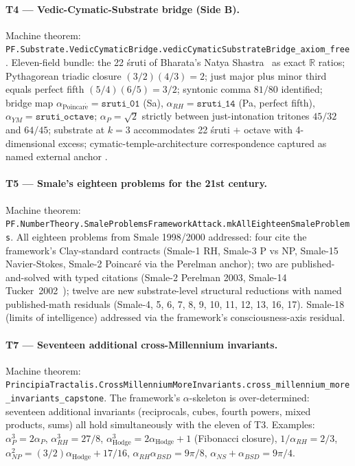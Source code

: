 \documentclass[11pt,a4paper]{article}
\theoremstyle{definition}
\begin{document}
\paragraph{T4 — Vedic-Cymatic-Substrate bridge (Side B).} Machine
theorem:
\texttt{PF.Substrate.VedicCymaticBridge.vedicCymaticSubstrateBridge\_axiom\_free}.
Eleven-field bundle: the 22 \'sruti of Bharata's Natya
Shastra~\cite{bharatamuninatyashastra} as exact $\mathbb{R}$ ratios;
Pythagorean triadic closure $(3/2)(4/3) = 2$; just major plus minor
third equals perfect fifth $(5/4)(6/5) = 3/2$; syntonic comma
$81/80$ identified; bridge map
$\alpha_{\mathrm{Poincar\acute{e}}} = \texttt{sruti\_01}$ (Sa),
$\alpha_{RH} = \texttt{sruti\_14}$ (Pa, perfect fifth),
$\alpha_{YM} = \texttt{sruti\_octave}$; $\alpha_P = \sqrt{2}$
strictly between just-intonation tritones $45/32$ and $64/45$;
substrate at $k = 3$ accommodates 22 \'sruti $+$ octave with
4-dimensional excess; cymatic-temple-architecture correspondence
captured as named external anchor \cite{chladni1787,jenny1967cymatics}.

\paragraph{T5 — Smale's eighteen problems for the 21st century.}
Machine theorem:
\texttt{PF.NumberTheory.SmaleProblemsFrameworkAttack.\allowbreak{}mkAllEighteenSmaleProblems}.
All eighteen problems from Smale 1998/2000
\cite{smale1998mathintelligencer,smale2000frontiers} addressed:
four cite the framework's Clay-standard contracts (Smale-1 RH,
Smale-3 P vs NP, Smale-15 Navier-Stokes, Smale-2 Poincar\'e via
the Perelman anchor); two are published-and-solved with typed
citations (Smale-2 Perelman 2003, Smale-14 Tucker~2002~\cite{tucker2002lorenz});
twelve are new substrate-level structural reductions with named
published-math residuals (Smale-4, 5, 6, 7, 8, 9, 10, 11, 12, 13,
16, 17). Smale-18 (limits of intelligence) addressed via the
framework's consciousness-axis residual.

\paragraph{T7 — Seventeen additional cross-Millennium invariants.}
Machine theorem:
\texttt{PrincipiaTractalis.CrossMillenniumMoreInvariants.\allowbreak{}cross\_millennium\_more\_invariants\_capstone}.
The framework's $\alpha$-skeleton is over-determined: seventeen
additional invariants (reciprocals, cubes, fourth powers, mixed
products, sums) all hold simultaneously with the eleven of T3.
Examples: $\alpha_P^3 = 2 \alpha_P$, $\alpha_{RH}^3 = 27/8$,
$\alpha_{\mathrm{Hodge}}^3 = 2 \alpha_{\mathrm{Hodge}} + 1$
(Fibonacci closure), $1/\alpha_{RH} = 2/3$,
$\alpha_{NP}^2 = (3/2) \alpha_{\mathrm{Hodge}} + 17/16$,
$\alpha_{RH} \alpha_{BSD} = 9\pi/8$,
$\alpha_{NS} + \alpha_{BSD} = 9\pi/4$.
\end{document}
